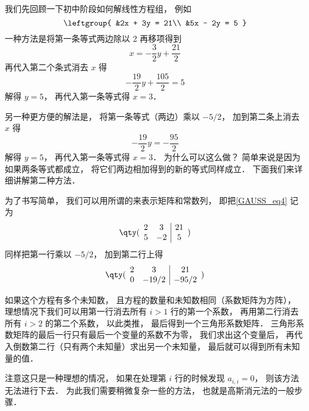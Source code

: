 \begin{exam}{}\label{GAUSS_ex1}
我们先回顾一下初中阶段如何解线性方程组， 例如
\begin{equation}\label{GAUSS_eq4}
\leftgroup{
&2x + 3y = 21\\
&5x - 2y = 5
}\end{equation}
一种方法是将第一条等式两边除以 2 再移项得到
\begin{equation}
x = - \frac32 y + \frac{21}{2}
\end{equation}
再代入第二个条式消去 $x$ 得
\begin{equation}
-\frac{19}{2} y + \frac{105}{2} = 5
\end{equation}
解得 $y = 5$， 再代入第一条等式得 $x = 3$．

另一种更方便的解法是， 将第一条等式（两边）乘以 $-5/2$， 加到第二条上消去 $x$ 得
\begin{equation}
-\frac{19}{2} y = -\frac{95}{2}
\end{equation}
解得 $y = 5$， 再代入第一条等式得 $x = 3$． 为什么可以这么做？  简单来说是因为如果两条等式都成立， 将它们两边相加得到的新的等式同样成立． 下面我们来详细讲解第二种方法．

为了书写简单， 我们可以用所谓的来表示矩阵和常数列， 即把\autoref{GAUSS_eq4} 记为
\begin{equation}
\qty( \begin{array}{cc|c}
	2 & 3 & 21 \\
	5 & -2 & 5
	\end{array} 
)\end{equation}
同样把第一行乘以 $-5/2$， 加到第二行上得
\begin{equation}
\qty( \begin{array}{cc|c}
	2 & 3 & 21 \\
	0 & -19/2 & -95/2
	\end{array} 
)\end{equation}

如果这个方程有多个未知数， 且方程的数量和未知数相同（系数矩阵为方阵）， 理想情况下我们可以用第一行消去所有 $i > 1$ 行的第一个系数， 再用第二行消去所有 $i > 2$ 的第二个系数， 以此类推， 最后得到一个三角形系数矩阵． 三角形系数矩阵的最后一行只有最后一个变量的系数不为零， 我们求出这个变量后， 再代入倒数第二行（只有两个未知量）求出另一个未知量， 最后就可以得到所有未知量的值．

注意这只是一种理想的情况， 如果在处理第 $i$ 行的时候发现 $a_{i,i} = 0$， 则该方法无法进行下去． 为此我们需要稍微复杂一些的方法， 也就是高斯消元法的一般步骤．
\end{exam}


